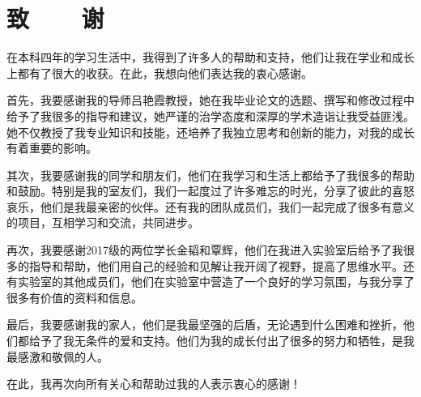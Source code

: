 \section*{致\ \ \ \ 谢}

在本科四年的学习生活中，我得到了许多人的帮助和支持，他们让我在学业和成长上都有了很大的收获。在此，我想向他们表达我的衷心感谢。

首先，我要感谢我的导师吕艳霞教授，她在我毕业论文的选题、撰写和修改过程中给予了我很多的指导和建议，她严谨的治学态度和深厚的学术造诣让我受益匪浅。她不仅教授了我专业知识和技能，还培养了我独立思考和创新的能力，对我的成长有着重要的影响。

其次，我要感谢我的同学和朋友们，他们在我学习和生活上都给予了我很多的帮助和鼓励。特别是我的室友们，我们一起度过了许多难忘的时光，分享了彼此的喜怒哀乐，他们是我最亲密的伙伴。还有我的团队成员们，我们一起完成了很多有意义的项目，互相学习和交流，共同进步。

再次，我要感谢2017级的两位学长金韬和覃辉，他们在我进入实验室后给予了我很多的指导和帮助，他们用自己的经验和见解让我开阔了视野，提高了思维水平。还有实验室的其他成员们，他们在实验室中营造了一个良好的学习氛围，与我分享了很多有价值的资料和信息。

最后，我要感谢我的家人，他们是我最坚强的后盾，无论遇到什么困难和挫折，他们都给予了我无条件的爱和支持。他们为我的成长付出了很多的努力和牺牲，是我最感激和敬佩的人。

在此，我再次向所有关心和帮助过我的人表示衷心的感谢！